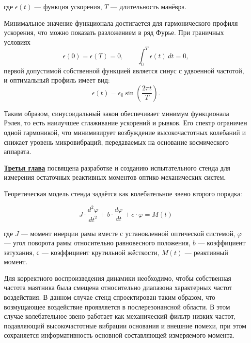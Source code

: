 где $\epsilon(t)$ --- функция ускорения, $T$ --- длительность манёвра.

Минимальное значение функционала достигается для гармонического профиля ускорения, что можно показать разложением в ряд Фурье. 
При граничных условиях
\begin{equation}
	\epsilon(0) = \epsilon(T) = 0, 
	\qquad 
	\int_{0}^{T} \epsilon(t)\,dt = 0,
\end{equation}
первой допустимой собственной функцией является синус с удвоенной частотой, и оптимальный профиль имеет вид:
\begin{equation}
	\epsilon(t) = \epsilon_0 \sin\!\left(\frac{2\pi t}{T}\right).
\end{equation}

Таким образом, синусоидальный закон обеспечивает минимум функционала Рэлея, то есть наилучшее сглаживание ускорений и рывков. 
Его спектр ограничен одной гармоникой, что минимизирует возбуждение высокочастотных колебаний и снижает уровень микровибраций, передаваемых на основание космического аппарата.





\underline{\textbf{Третья глава}} посвящена разработке и созданию испытательного стенда для измерения остаточных реактивных моментов оптико-механических систем.

Теоретическая модель стенда задаётся как колебательное звено второго порядка:

\begin{equation}
	\label{eq:stadeq}
	J\cdot \frac{d^2\varphi}{dt^2}+b \cdot \frac{d\varphi}{dt}+ c \cdot \varphi = M(t)
\end{equation}

где \(J\) --- момент инерции рамы вместе с установленной оптической системой, \(\varphi\) --- угол поворота рамы относительно равновесного положения, \(b\) --- коэффициент затухания, \(с\) --- коэффициент крутильной жёсткости, \(M(t)\) --- реактивный момент.

Для корректного воспроизведения динамики необходимо, чтобы собственная частота маятника была смещена относительно диапазона характерных частот воздействия. В данном случае стенд спроектирован таким образом, что возмущающее воздействие проявляется в послерезонансной области. В этом случае колебательное звено работает как механический фильтр низких частот, подавляющий высокочастотные вибрации основания и внешние помехи, при этом сохраняется информативность основной составляющей измеряемого момента.

